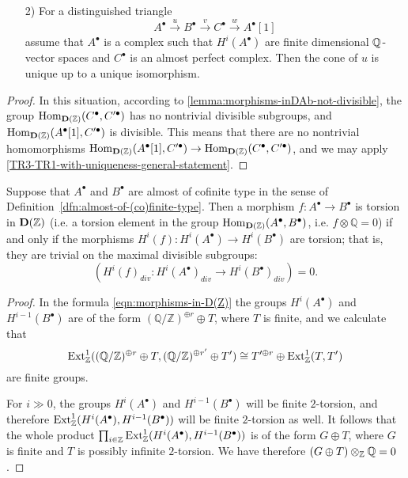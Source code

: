 \documentclass{article}
\numberwithin{equation}{section}
\begin{document}
\begin{appendices}
\begin{corollary}
\begin{enumerate}
  \item[2)] For a distinguished triangle
    $$A^\bullet \xrightarrow{u} B^\bullet \xrightarrow{v} C^\bullet \xrightarrow{w} A^\bullet[1]$$
    assume that $A^\bullet$ is a complex such that $H^i (A^\bullet)$ are finite
    dimensional $\mathbb{Q}$-vector spaces and $C^\bullet$ is an almost perfect
    complex. Then the cone of $u$ is unique up to a unique isomorphism.
  \end{enumerate}

  \begin{proof}
    In this situation, according to \ref{lemma:morphisms-inDAb-not-divisible},
    the group $\operatorname{Hom}_{\mathbf{D} (\mathbb{Z})} (C^\bullet, C'^\bullet)$ has no
    nontrivial divisible subgroups, and
    $\operatorname{Hom}_{\mathbf{D} (\mathbb{Z})} (A^\bullet [1], C'^\bullet)$ is divisible. This
    means that there are no nontrivial homomorphisms
    $\operatorname{Hom}_{\mathbf{D} (\mathbb{Z})} (A^\bullet [1], C'^\bullet) \to \operatorname{Hom}_{\mathbf{D} (\mathbb{Z})} (C^\bullet, C'^\bullet)$,
    and we may apply \ref{TR3-TR1-with-uniqueness-general-statement}.
  \end{proof}
\end{corollary}

\begin{lemma}
  \label{lemma:torsion-morphisms-in-D(Z)}
  Suppose that $A^\bullet$ and $B^\bullet$ are almost of cofinite type in the
  sense of Definition~\ref{dfn:almost-of-(co)finite-type}. Then a morphism
  $f\colon A^\bullet\to B^\bullet$ is torsion in $\mathbf{D} (\mathbb{Z})$
  (i.e. a torsion element in the group
  $\operatorname{Hom}_{\mathbf{D} (\mathbb{Z})} (A^\bullet, B^\bullet)$, i.e.
  $f\otimes \mathbb{Q} = 0$) if and only if the morphisms
  $H^i (f)\colon H^i (A^\bullet) \to H^i (B^\bullet)$
  are torsion; that is, they are trivial on the maximal divisible subgroups:
  $$(H^i (f)_{div}\colon H^i (A^\bullet)_{div} \to H^i (B^\bullet)_{div}) = 0.$$

  \begin{proof}
    In the formula \eqref{eqn:morphisms-in-D(Z)} the groups $H^i (A^\bullet)$
    and $H^{i-1} (B^\bullet)$ are of the form
    $(\mathbb{Q}/\mathbb{Z})^{\oplus r} \oplus T$, where $T$ is finite, and we
    calculate that
    \[ \operatorname{Ext}_{\mathbb{Z}}^1 ((\mathbb{Q}/\mathbb{Z})^{\oplus r} \oplus T, (\mathbb{Q}/\mathbb{Z})^{\oplus r'} \oplus T') \cong
    T'^{\oplus r} \oplus \operatorname{Ext}_{\mathbb{Z}}^1 (T, T') \]
    are finite groups.

    For $i \gg 0$, the groups $H^i (A^\bullet)$ and $H^{i-1} (B^\bullet)$ will
    be finite $2$-torsion, and therefore
    $\operatorname{Ext}_{\mathbb{Z}}^1 (H^i (A^\bullet), H^{i-1} (B^\bullet))$ will be finite
    $2$-torsion as well. It follows that the whole product
    $\prod_{i\in \mathbb{Z}} \operatorname{Ext}_{\mathbb{Z}}^1 (H^i (A^\bullet), H^{i-1} (B^\bullet))$
    is of the form $G \oplus T$, where $G$ is finite and $T$ is possibly
    infinite $2$-torsion. We have therefore $(G \oplus T)\otimes_{\mathbb{Z}} \mathbb{Q} = 0$.


\end{proof}
\end{lemma}
\end{appendices}
\end{document}

